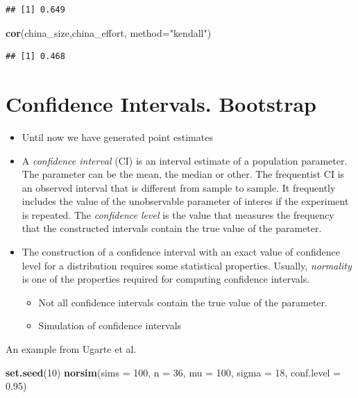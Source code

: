 \documentclass[]{book}
\newenvironment{Shaded}{\begin{snugshade}}{\end{snugshade}}
\newcommand{\KeywordTok}[1]{\textcolor[rgb]{0.13,0.29,0.53}{\textbf{{#1}}}}
\newcommand{\DataTypeTok}[1]{\textcolor[rgb]{0.13,0.29,0.53}{{#1}}}
\newcommand{\DecValTok}[1]{\textcolor[rgb]{0.00,0.00,0.81}{{#1}}}
\newcommand{\FloatTok}[1]{\textcolor[rgb]{0.00,0.00,0.81}{{#1}}}
\newcommand{\StringTok}[1]{\textcolor[rgb]{0.31,0.60,0.02}{{#1}}}
\newcommand{\NormalTok}[1]{{#1}}
\providecommand{\tightlist}{%
  \setlength{\itemsep}{0pt}\setlength{\parskip}{0pt}}
\begin{document}
\begin{verbatim}
## [1] 0.649
\end{verbatim}

\begin{Shaded}
\begin{Highlighting}[]
\KeywordTok{cor}\NormalTok{(china_size,china_effort, }\DataTypeTok{method=}\StringTok{"kendall"}\NormalTok{)}
\end{Highlighting}
\end{Shaded}

\begin{verbatim}
## [1] 0.468
\end{verbatim}

\section{Confidence Intervals.
Bootstrap}\label{confidence-intervals.-bootstrap}

\begin{itemize}
\tightlist
\item
  Until now we have generated point estimates
\item
  A \emph{confidence interval} (CI) is an interval estimate of a
  population parameter. The parameter can be the mean, the median or
  other. The frequentist CI is an observed interval that is different
  from sample to sample. It frequently includes the value of the
  unobservable parameter of interes if the experiment is repeated. The
  \emph{confidence level} is the value that measures the frequency that
  the constructed intervals contain the true value of the parameter.
\item
  The construction of a confidence interval with an exact value of
  confidence level for a distribution requires some statistical
  properties. Usually, \emph{normality} is one of the properties
  required for computing confidence intervals.

  \begin{itemize}
  \tightlist
  \item
    Not all confidence intervals contain the true value of the
    parameter.
  \item
    Simulation of confidence intervals
  \end{itemize}
\end{itemize}

An example from Ugarte et al. \citep{ugarte2015probability}

\begin{Shaded}
\begin{Highlighting}[]
\KeywordTok{set.seed}\NormalTok{(}\DecValTok{10}\NormalTok{)}
\KeywordTok{norsim}\NormalTok{(}\DataTypeTok{sims =} \DecValTok{100}\NormalTok{, }\DataTypeTok{n =} \DecValTok{36}\NormalTok{, }\DataTypeTok{mu =} \DecValTok{100}\NormalTok{, }\DataTypeTok{sigma =} \DecValTok{18}\NormalTok{, }\DataTypeTok{conf.level =} \FloatTok{0.95}\NormalTok{)}
\end{Highlighting}
\end{Shaded}
\end{document}
